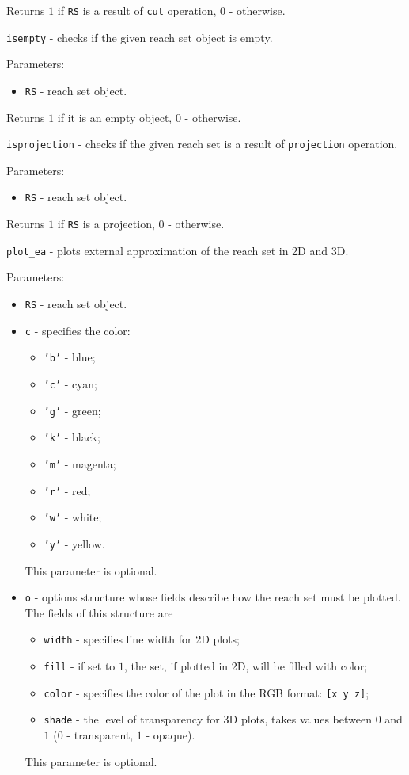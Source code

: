 Returns $1$ if {\tt RS} is a result of {\tt cut} operation, $0$ - otherwise.

\newpage

{\Large {\tt isempty}} - checks if the given reach set object is empty.

Parameters:
\begin{itemize}
\item {\tt RS} - reach set object.
\end{itemize}

Returns $1$ if it is an empty object, $0$ - otherwise.

\newpage

{\Large {\tt isprojection}} - checks if the given reach set is a result
of {\tt projection} operation.

Parameters:
\begin{itemize}
\item {\tt RS} - reach set object.
\end{itemize}

Returns $1$ if {\tt RS} is a projection, $0$ - otherwise.

\newpage

{\Large {\tt plot\_ea}} - plots external approximation of the reach set
in 2D and 3D.

Parameters:
\begin{itemize}
\item {\tt RS} - reach set object.
\item {\tt c} - specifies the color:
\begin{itemize}
\item {\tt 'b'} - blue;
\item {\tt 'c'} - cyan;
\item {\tt 'g'} - green;
\item {\tt 'k'} - black;
\item {\tt 'm'} - magenta;
\item {\tt 'r'} - red;
\item {\tt 'w'} - white;
\item {\tt 'y'} - yellow.
\end{itemize}
This parameter is optional.
\item {\tt o} - options structure whose fields describe how the reach set
must be plotted. The fields of this structure are
\begin{itemize}
\item {\tt width} - specifies line width for 2D plots;
\item {\tt fill} - if set to $1$, the set, if plotted in 2D,
will be filled with color;
\item {\tt color} - specifies the color of the plot in the RGB format:
{\tt [x y z]};
\item {\tt shade} - the level of transparency for 3D plots, takes values
between $0$ and $1$ ($0$ - transparent, $1$ - opaque).
\end{itemize}
This parameter is optional.
\end{itemize}

